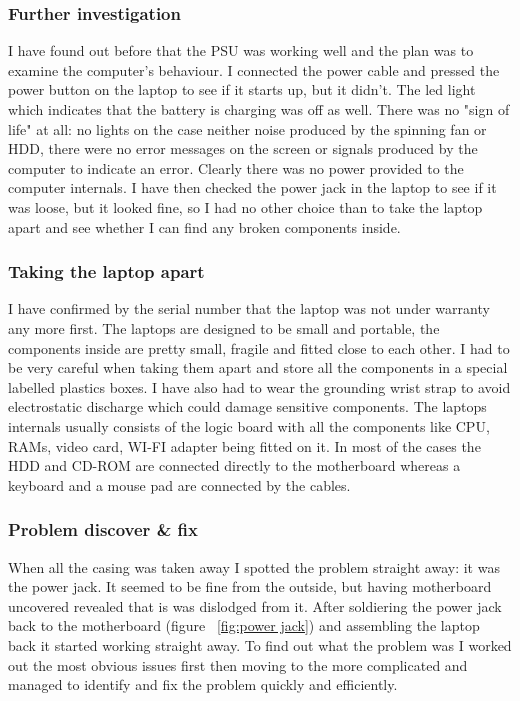 \documentclass[10pt,a4paper,headinclude=true,twoside]{report}
\begin{document}
\subsubsection{Further investigation}
I have found out before that the PSU was working well and the plan was to examine the computer's behaviour. I connected the power cable and pressed the power button on the laptop to see if it starts up, but it didn't. The led light which indicates that the battery is charging was off as well. There was no "sign of life" at all: no lights on the case neither noise produced by the spinning fan or HDD, there were no error messages on the screen or signals produced by the computer to indicate an error. Clearly there was no power provided to the computer internals. I have then checked the power jack in the laptop to see if it was loose, but it looked fine, so I had no other choice than to take the laptop apart and see whether I can find any broken components inside. 
\subsubsection{Taking the laptop apart}
I have confirmed by the serial number that the laptop was not under warranty any more first. The laptops are designed to be small and portable, the components inside are pretty small, fragile and fitted close to each other. I had to be very careful when taking them apart and store all the components in a special labelled plastics boxes. I have also had to wear the grounding wrist strap to avoid electrostatic discharge which could damage sensitive components. The laptops internals usually consists of the logic board with all the components like CPU, RAMs, video card, WI-FI adapter being fitted on it. In most of the cases the HDD and CD-ROM are connected directly to the motherboard whereas a keyboard and a mouse pad are connected by the cables. 
\subsubsection{Problem discover \& fix}
When all the casing was taken away I spotted the problem straight away: it was the power jack. It seemed to be fine from the outside, but having motherboard uncovered revealed that is was dislodged from it. After soldiering the power jack back to the motherboard (figure ~\ref{fig:power jack}) and assembling the laptop back it started working straight away. To find out what the problem was I worked out the most obvious issues first then moving to the more complicated and managed to identify and fix the problem quickly and efficiently.
\end{document}
